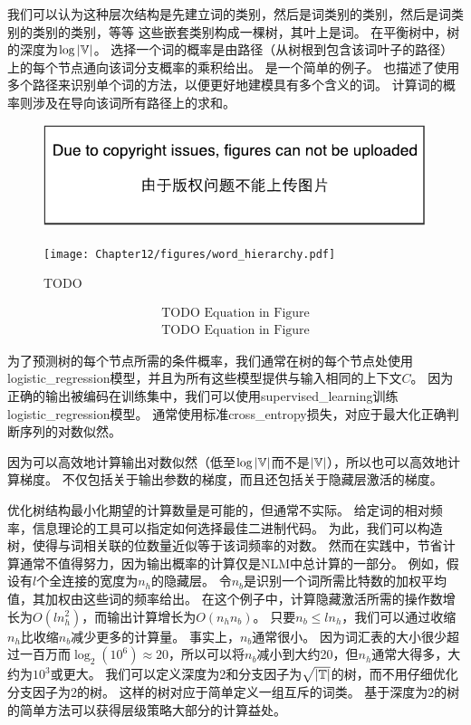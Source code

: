 我们可以认为这种层次结构是先建立词的类别，然后是词类别的类别，然后是词类别的类别的类别，等等
这些嵌套类别构成一棵树，其叶上是词。
在平衡树中，树的深度为$\log |\mathbb{V}|$。
选择一个词的概率是由路径（从树根到包含该词叶子的路径）上的每个节点通向该词分支概率的乘积给出。
是一个简单的例子。
\citet{Mnih+Hinton-2009}也描述了使用多个路径来识别单个词的方法，以便更好地建模具有多个含义的词。
计算词的概率则涉及在导向该词所有路径上的求和。
\begin{figure}[htp]
\centering
\ifOpenSource
\centerline{\includegraphics{figure.pdf}}
\else
\texttt{[image: Chapter12/figures/word\_hierarchy.pdf]}
\fi
\captionsetup{singlelinecheck=off}
\caption{TODO}
\label{fig:chap12_word_hierarchy}
\end{figure}
\begin{align}
    \text{TODO Equation in Figure}  \\
    \text{TODO Equation in Figure}
\end{align}

为了预测树的每个节点所需的条件概率，我们通常在树的每个节点处使用\gls{logistic_regression}模型，并且为所有这些模型提供与输入相同的上下文$C$。
因为正确的输出被编码在训练集中，我们可以使用\gls{supervised_learning}训练\gls{logistic_regression}模型。
通常使用标准\gls{cross_entropy}损失，对应于最大化正确判断序列的对数似然。

因为可以高效地计算输出对数似然（低至$\log |\mathbb{V}|$而不是$ |\mathbb{V}|$），所以也可以高效地计算梯度。
不仅包括关于输出参数的梯度，而且还包括关于隐藏层激活的梯度。

优化树结构最小化期望的计算数量是可能的，但通常不实际。
给定词的相对频率，信息理论的工具可以指定如何选择最佳二进制代码。
为此，我们可以构造树，使得与词相关联的位数量近似等于该词频率的对数。
然而在实践中，节省计算通常不值得努力，因为输出概率的计算仅是\gls{NLM}中总计算的一部分。
例如，假设有$l$个全连接的宽度为$n_h$的隐藏层。
令$n_b$是识别一个词所需比特数的加权平均值，其加权由这些词的频率给出。
在这个例子中，计算隐藏激活所需的操作数增长为$O(ln_h^2)$，而输出计算增长为$O(n_h n_b)$。
只要$ n_b \leq l n_h$，我们可以通过收缩$n_h$比收缩$n_b$减少更多的计算量。
事实上，$n_b$通常很小。
因为词汇表的大小很少超过一百万而$\log_ 2(10^6) \approx 20$，所以可以将$n_b$减小到大约20，但$n_h$通常大得多，大约为$10^3$或更大。
我们可以定义深度为2和分支因子为$\sqrt{|\mathbb{T}|}$的树，而不用仔细优化分支因子为$2$的树。
这样的树对应于简单定义一组互斥的词类。
基于深度为$2$的树的简单方法可以获得层级策略大部分的计算益处。

